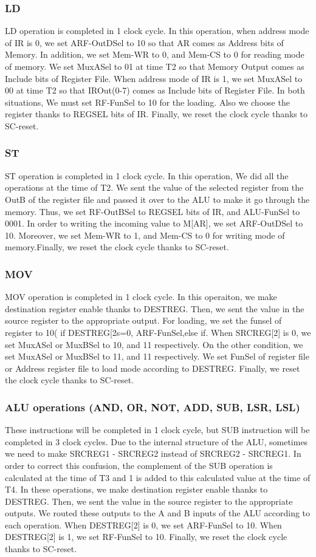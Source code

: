 \documentclass[pdftex,12pt,a4paper]{article}
\begin{document}
\subsubsection{LD}
LD operation is completed in 1 clock cycle. In this operation, when address mode of IR is 0, we set ARF-OutDSel to 10 so that AR comes as Address bits of Memory. In addition, we set Mem-WR to 0, and Mem-CS to 0 for reading mode of memory. We set MuxASel to 01 at time T2 so that Memory Output comes as Include bits of Register File.
When address mode of IR is 1, we set MuxASel to 00 at time T2 so that IROut(0-7) comes as Include bits of Register File.
In both situations, We must set RF-FunSel to 10 for the loading. Also we choose the register thanks to REGSEL bits of IR.
Finally, we reset the clock cycle thanks to SC-reset.
\subsubsection{ST}
ST operation is completed in 1 clock cycle. In this operation, We did all the operations at the time of T2. We sent the value of the selected register from the OutB of the register file and passed it over to the ALU to make it go through the memory. Thus, we set RF-OutBSel to REGSEL bits of IR, and ALU-FunSel to 0001. In order to writing the incoming value to M[AR], we set ARF-OutDSel to 10. Moreover, we set Mem-WR to 1, and Mem-CS to 0 for writing mode of memory.Finally, we reset the clock cycle thanks to SC-reset.
\subsubsection{MOV}
MOV operation is completed in 1 clock cycle. In this operaiton, we make destination register enable thanks to DESTREG. Then, we sent the value in the source register to the appropriate output. For loading, we set the funsel of register to 10( if DESTREG[2s=0, ARF-FunSel,else if. When SRCREG[2] is 0, we set MuxASel or MuxBSel to 10, and 11 respectively. On the other condition, we set MuxASel or MuxBSel to 11, and 11 respectively. We set FunSel of register file or Address register file to load mode according to DESTREG. Finally, we reset the clock cycle thanks to SC-reset.
\subsubsection{ALU operations (AND, OR, NOT, ADD, SUB, LSR, LSL)}
These instructions will be completed in 1 clock cycle, but SUB instruction will be completed in 3 clock cycles. Due to the internal structure of the ALU, sometimes we need to make SRCREG1 - SRCREG2 instead of SRCREG2 - SRCREG1. In order to correct this confusion, the complement of the SUB operation is calculated at the time of T3 and 1 is added to this calculated value at the time of T4. In these operations, we make destination register enable thanks to DESTREG. Then, we sent the value in the source register to the appropriate outputs. We routed these outputs to the A and B inputs of the ALU according to each operation. When DESTREG[2] is 0, we set ARF-FunSel to 10. When DESTREG[2] is 1, we set RF-FunSel to 10. Finally, we reset the clock cycle thanks to SC-reset.
\end{document}

